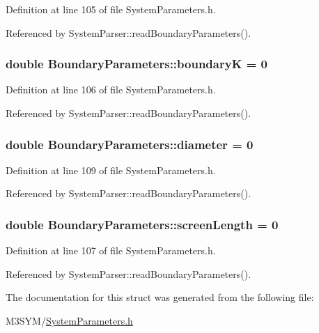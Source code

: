 Definition at line 105 of file System\+Parameters.\+h.



Referenced by System\+Parser\+::read\+Boundary\+Parameters().

\hypertarget{structBoundaryParameters_aeb92b89caa0bf379a2dd1e26a032bb75}{
\subsubsection[{boundary\+K}]{\setlength{\rightskip}{0pt plus 5cm}double Boundary\+Parameters\+::boundary\+K = 0}}\label{structBoundaryParameters_aeb92b89caa0bf379a2dd1e26a032bb75}


Definition at line 106 of file System\+Parameters.\+h.



Referenced by System\+Parser\+::read\+Boundary\+Parameters().

\hypertarget{structBoundaryParameters_aff24f2bccaef825eff7c3181ec1cefcc}{
\subsubsection[{diameter}]{\setlength{\rightskip}{0pt plus 5cm}double Boundary\+Parameters\+::diameter = 0}}\label{structBoundaryParameters_aff24f2bccaef825eff7c3181ec1cefcc}


Definition at line 109 of file System\+Parameters.\+h.



Referenced by System\+Parser\+::read\+Boundary\+Parameters().

\hypertarget{structBoundaryParameters_a75161f641debbb58f2829d8bba03b532}{
\subsubsection[{screen\+Length}]{\setlength{\rightskip}{0pt plus 5cm}double Boundary\+Parameters\+::screen\+Length = 0}}\label{structBoundaryParameters_a75161f641debbb58f2829d8bba03b532}


Definition at line 107 of file System\+Parameters.\+h.



Referenced by System\+Parser\+::read\+Boundary\+Parameters().



The documentation for this struct was generated from the following file\+:\begin{DoxyCompactItemize}
\item 
M3\+S\+Y\+M/\hyperlink{SystemParameters_8h}{System\+Parameters.\+h}\end{DoxyCompactItemize}
